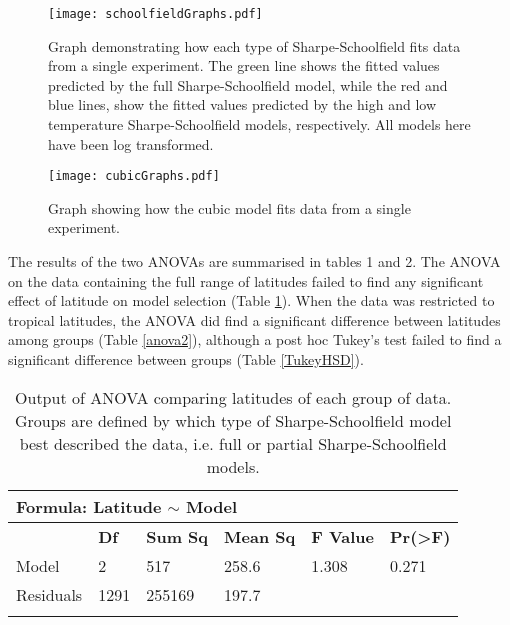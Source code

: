 \documentclass[a4paper, 11pt]{article}
\begin{document}
\begin{linenumbers}
\begin{figure}[H]
\centering
\texttt{[image: schoolfieldGraphs.pdf]}
\caption{\label{fig:school} Graph demonstrating how each type of Sharpe-Schoolfield fits data from a single experiment. The green line shows the fitted values predicted by the full Sharpe-Schoolfield model, while the red and blue lines, show the fitted values predicted by the high and low temperature Sharpe-Schoolfield models, respectively. All models here have been log transformed.}
\end{figure}



\begin{figure}[H]
\centering
\texttt{[image: cubicGraphs.pdf]}
\caption{\label{fig:cubic} Graph showing how the cubic model fits data from a single experiment.}
\end{figure}

The results of the two ANOVAs are summarised in tables 1 and 2. The ANOVA on the data containing the full range of latitudes failed to find any significant effect of latitude on model selection (Table \ref{anova}). When the data was restricted to tropical latitudes, the ANOVA did find a significant difference between latitudes among groups (Table \ref{anova2}), although a post hoc Tukey's test failed to find a significant difference between groups (Table \ref{TukeyHSD}). 

\begin{table}[ht]
\centering
\caption{Output of ANOVA comparing latitudes of each group of data. Groups are defined by which type of Sharpe-Schoolfield model best described the data, i.e. full or partial Sharpe-Schoolfield models.}
\vspace{0.2cm}
\label{anova}
\begin{tabular}{llllll}
\hline
\multicolumn{6}{l}{Formula: Latitude $\sim$ Model}                                          \\ \hline
          & \textbf{Df} & \textbf{Sum Sq} & \textbf{Mean Sq} & \textbf{F Value} & \textbf{Pr(>F)} \\
Model     & 2           & 517             & 258.6            & 1.308            & 0.271           \\
Residuals & 1291        & 255169          & 197.7            &                  &                 \\
          &             &                 &                  &                  &                 \\  
\end{tabular}
\end{table}


\end{linenumbers}
\end{document}
